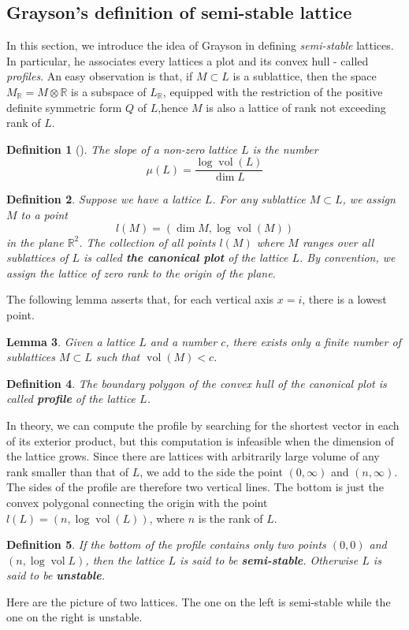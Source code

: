 \documentclass[12pt]{article} %
\newtheorem{definition}{Definition}[section]
\newtheorem{lemma}[definition]{Lemma}
\DeclareMathOperator{\vol}{vol}
\begin{document}
\subsection{Grayson's definition of semi-stable lattice}
In this section, we introduce the idea of Grayson in defining \textit{semi-stable} lattices.
In particular, he associates every lattices a plot and its convex hull - called \textit{ profiles}.
An easy observation is that, if $M \subset L$ is a sublattice, then the space $M_\mathbb{R} = M \otimes \mathbb{R}$
is a subspace of $L_\mathbb{R}$, equipped with the restriction of the positive definite symmetric form $Q$ of $L$,hence $M$
is also a lattice of rank not exceeding rank of $L$.
\begin{definition}[\label = slope]
    The slope of a non-zero lattice $L$ is the number
    \[\mu(L) = \dfrac{\log\vol(L)}{\dim L}\]
\end{definition}
\begin{definition}
    Suppose we have a lattice $L$. For any sublattice $M \subset L$, we assign $M$ to a point
    \[l(M) = \left(\dim M, \log\vol(M)\right)\]
    in the plane $\mathbb{R}^2$. The collection of all points $l(M)$ where $M$ ranges over
    all sublattices of $L$ is called \textbf{ the canonical plot} of the lattice $L$. By convention, we assign
    the lattice of zero rank to the origin of the plane.
\end{definition}
The following lemma asserts that, for each vertical axis $x =i$, there is a lowest point.
\begin{lemma}
    Given a lattice $L$ and a number $c$, there exists only a finite number of sublattices $M \subset L$ such that
    $\vol(M)<c$.
\end{lemma}
\begin{definition}
    The boundary polygon of the convex hull of the canonical plot is called \textbf{profile} of the lattice $L$.
\end{definition}
In theory, we can compute the profile by searching for the shortest vector in each of its exterior product, but this computation
is infeasible when the dimension of the lattice grows. Since there are lattices with
arbitrarily large volume of any rank smaller than that of $L$, we add to the side the point $(0,\infty)$ and $(n,\infty)$. The sides
of the profile are therefore two vertical lines. The bottom is just the convex polygonal connecting the origin with the point
$l(L) = (n,\log\vol(L))$, where $n$ is the rank of $L$.
\begin{definition}\label{ss1}
    If the bottom of the profile contains only two points $(0,0)$ and $(n,\log\vol L)$, then the
    lattice $L$ is said to be \textbf{semi-stable}. Otherwise $L$ is said to be \textbf{unstable}.
\end{definition}
Here are the picture of two lattices. The one on the left is semi-stable while the one on the right is unstable.
\end{document}
